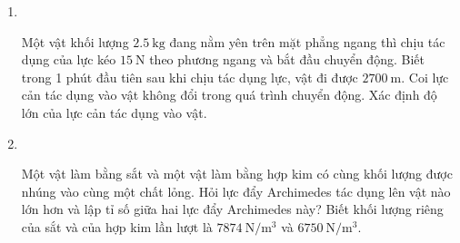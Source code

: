 \begin{enumerate}[label=\bfseries Bài \arabic*:]
{}

\item{}\\
{Một vật khối lượng $\SI{2.5}{\kilogram}$ đang nằm yên trên mặt phẳng ngang thì chịu tác dụng của lực kéo $\SI{15}{\newton}$ theo phương ngang và bắt đầu chuyển động. Biết trong 1 phút đầu tiên sau khi chịu tác dụng lực, vật đi được $\SI{2700}{\meter}$. Coi lực cản tác dụng vào vật không đổi trong quá trình chuyển động. Xác định độ lớn của lực cản tác dụng vào vật.

}
	
\item {}\\
{Một vật làm bằng sắt và một vật làm bằng hợp kim có cùng khối lượng được nhúng vào cùng một chất lỏng. Hỏi lực đẩy Archimedes tác dụng lên vật nào lớn hơn và lập tỉ số giữa hai lực đẩy Archimedes này? Biết khối lượng riêng của sắt và của hợp kim lần lượt là $\SI{7874}{\newton/\meter^3}$ và $\SI{6750}{\newton/\meter^3}$.

}
\end{enumerate}